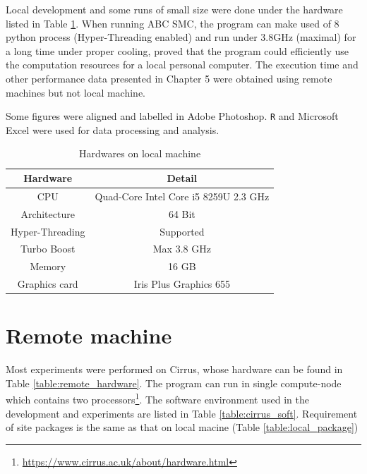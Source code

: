 Local development and some runs of small size were done under the hardware listed in Table \ref{table:local_hardware}. When running ABC SMC, the program can make used of 8 python process (Hyper-Threading enabled) and run under 3.8GHz (maximal) for a long time under proper cooling, proved that the program could efficiently use the computation resources for a local personal computer. The execution time and other performance data presented in Chapter 5 were obtained using remote machines but not local machine. 

Some figures were aligned and labelled in Adobe Photoshop. \verb|R| and Microsoft Excel were used for data processing and analysis. 

\begin{table}
    \centering
    \begin{tabular}{|c c|}
        \hline
        Hardware        & Detail                                \\ [0.5ex]
        \hline\hline
        CPU             & Quad-Core Intel Core i5 8259U 2.3 GHz \\
        Architecture    & 64 Bit                                \\
        Hyper-Threading & Supported                             \\
        Turbo Boost     & Max 3.8 GHz                           \\
        Memory          & 16 GB                                 \\
        Graphics card   & Iris Plus Graphics 655                \\
        \hline
    \end{tabular}
    \caption{Hardwares on local machine}
    \label{table:local_hardware}
\end{table}



\section{Remote machine}

Most experiments were performed on Cirrus, whose hardware can be found in Table \ref{table:remote_hardware}. The program can run in single compute-node which contains two processors\footnote{\url{https://www.cirrus.ac.uk/about/hardware.html}}. The software environment used in the development and experiments are listed in Table \ref{table:cirrus_soft}. Requirement of site packages is the same as that on local macine (Table \ref{table:local_package})

